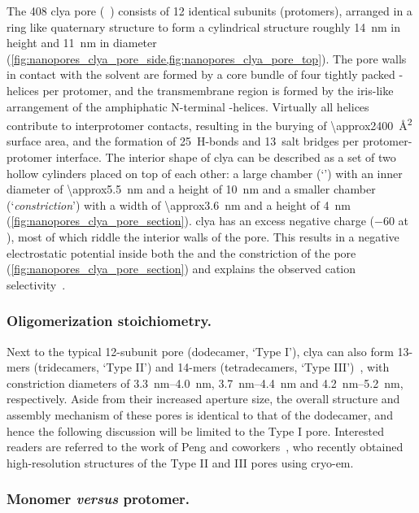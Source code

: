The \SI{408}{\kDa} \gls{clya} pore (~\cite{Peng-2019}) consists of 12 identical subunits
(protomers), arranged in a ring like quaternary structure to form a cylindrical structure roughly \SI{14}{\nm}
in height and \SI{11}{\nm} in diameter (\cref{fig:nanopores_clya_pore_side,fig:nanopores_clya_pore_top}). The
pore walls in contact with the solvent are formed by a core bundle of four tightly packed \ta-helices per
protomer, and the transmembrane region is formed by the iris-like arrangement of the amphiphatic N-terminal
\ta-helices. Virtually all helices contribute to interprotomer contacts, resulting in the burying of
\SI{\approx2400}{\square\angstrom} surface area, and the formation of 25~H-bonds and 13~salt bridges per
protomer-protomer interface. The interior shape of \gls{clya} can be described as a set of two hollow
cylinders placed on top of each other: a large \cisi{} chamber (`\lumen{}') with an inner diameter of
\SI{\approx5.5}{\nm} and a height of \SI{10}{\nm} and a smaller \transi{} chamber (`\textit{constriction}')
with a width of \SI{\approx3.6}{\nm} and a height of \SI{4}{\nm} (\cref{fig:nanopores_clya_pore_section}).
\Gls{clya} has an excess negative charge (\SI{-60}{\ec} at ), most of which riddle the interior walls
of the pore. This results in a negative electrostatic potential inside both the \lumen{} and the constriction
of the pore (\cref{fig:nanopores_clya_pore_section}) and explains the observed cation
selectivity~\cite{Soskine-2012,Franceschini-2016}.

\subsubsection{Oligomerization stoichiometry.}
%

Next to the typical 12-subunit pore (dodecamer, `Type I'), \gls{clya} can also form 13-mers (tridecamers,
`Type II') and 14-mers (tetradecamers, `Type III')~\cite{Soskine-2013,Peng-2019}, with constriction diameters
of \SIrange{3.3}{4.0}{\nm}, \SIrange{3.7}{4.4}{\nm} and \SIrange{4.2}{5.2}{\nm}, respectively. Aside from
their increased aperture size, the overall structure and assembly mechanism of these pores is identical to
that of the dodecamer, and hence the following discussion will be limited to the Type I pore. Interested
readers are referred to the work of Peng and coworkers~\cite{Peng-2019}, who recently obtained high-resolution
structures of the Type II and III pores using \gls{cryo-em}.


\subsubsection{Monomer \textit{versus} protomer.}
%

